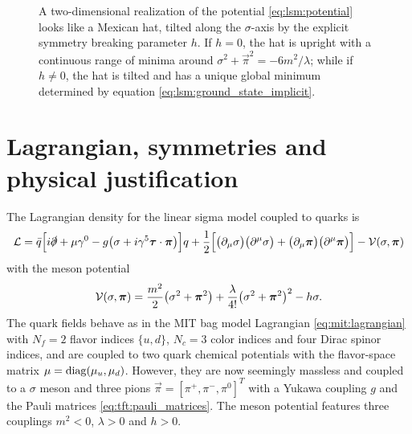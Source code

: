 \begin{figure}
\centering
{}
\caption{\label{fig:lsm:potential}%
	A two-dimensional realization of the potential \eqref{eq:lsm:potential} looks like a Mexican hat, tilted along the $\sigma$-axis by the explicit symmetry breaking parameter $h$.
	If $h = 0$, the hat is upright with a continuous range of minima around $\sigma^2 + \vec\pi^2 = -6m^2 / \lambda$;
	while if $h \neq 0$, the hat is tilted and has a unique global minimum determined by equation \eqref{eq:lsm:ground_state_implicit}.
}
\end{figure}

\section{Lagrangian, symmetries and physical justification}
\label{sec:lsm:vacuum}

The Lagrangian density for the linear sigma model coupled to quarks is \cite{ref:lsm_2f}
\begin{equation}
	\mathcal{L} = \bar{q} \Big[ i \slashed\partial + \mu \gamma^0 - g \big( \sigma + i \gamma^5 {\bm{\tau}} \cdot {\bm{\pi}} \big) \Big] q
	      + \frac12 \Big[ \big( \partial_\mu \sigma \big) \big( \partial^\mu \sigma \big) + \big( \partial_\mu {\bm{\pi}} \big) \big( \partial^\mu {\bm{\pi}} \big) \Big] - \mathcal{V}(\sigma,{\bm{\pi}})
\label{eq:lsm:lagrangian}
\end{equation}
with the meson potential
\begin{equation}
	\mathcal{V}(\sigma, {\bm{\pi}}) = \frac{m^2}{2} \big( \sigma^2 + {\bm{\pi}}^2 \big) + \frac{\lambda}{4!} \big( \sigma^2 + {\bm{\pi}}^2 \big)^2 - h \sigma .
\label{eq:lsm:potential}
\end{equation}
The quark fields behave as in the MIT bag model Lagrangian \eqref{eq:mit:lagrangian} with $N_f=2$ flavor indices $\{u,d\}$, $N_c=3$ color indices and four Dirac spinor indices, and are coupled to two quark chemical potentials with the flavor-space matrix $\mu = \operatorname{diag} (\mu_u, \mu_d)$.
However, they are now seemingly massless and coupled to a $\sigma$ meson and three pions $\vec\pi = [\pi^+, \pi^-, \pi^0]^T$ with a Yukawa coupling $g$ and the Pauli matrices \eqref{eq:tft:pauli_matrices}.
The meson potential features three couplings $m^2<0$, $\lambda>0$ and $h>0$.

